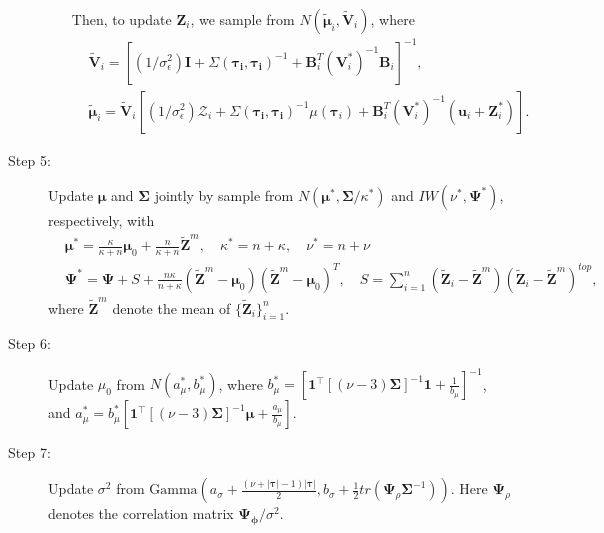 \begin{description}
\begin{itemize}
Then, to update $\mathbf{Z}_i$, we sample from $N(\tilde{\boldsymbol{\mu}}_i,\tilde{\mathbf{V}}_i)$, where
\begin{equation*}
\begin{split}
&\tilde{\mathbf{V}}_i=[(1/\sigma_{\epsilon}^2)\mathbf{I}+\Sigma(\boldsymbol{\tau_i},\boldsymbol{\tau_i})^{-1}+\mathbf{B}_i^T(\boldsymbol{V}_i^*)^{-1}\mathbf{B}_i]^{-1},\\
&\tilde{\boldsymbol{\mu}}_i=\tilde{\mathbf{V}}_i[(1/\sigma_{\epsilon}^2)\boldsymbol{\mathcal{Z}}_i+\Sigma(\boldsymbol{\tau_i},\boldsymbol{\tau_i})^{-1}\mu(\mathbf{\tau}_i)+\mathbf{B}_i^T(\boldsymbol{V}_i^*)^{-1}(\mathbf{u}_i+\mathbf{Z}_i^*)].
\end{split}
\end{equation*}
   \end{itemize}
 
   \item[Step 5:] Update $\boldsymbol{\mu}$ and $\boldsymbol{\Sigma}$ jointly by sample from $N(\boldsymbol{\mu}^*,\boldsymbol{\Sigma}/\kappa^*)$ and $IW(\nu^*,\boldsymbol{\Psi}^*)$, respectively, with
   \begin{equation*}
\begin{split}
&\boldsymbol{\mu}^*=\frac{\kappa}{\kappa+n}\boldsymbol{\mu}_0+\frac{n}{\kappa+n}\tilde{\mathbf{Z}}^m,\quad
\kappa^*=n+\kappa,\quad \nu^*=n+\nu\\
&\boldsymbol{\Psi}^*=\boldsymbol{\Psi}+S+\frac{n\kappa}{n+\kappa}(\tilde{\mathbf{Z}}^m-\boldsymbol{\mu}_0)(\tilde{\mathbf{Z}}^m-\boldsymbol{\mu}_0)^T,\quad
S=\sum^{n}_{i=1}(\tilde{\mathbf{Z}}_i-\tilde{\mathbf{Z}}^m)(\tilde{\mathbf{Z}}_i-\tilde{\mathbf{Z}}^m)^{top},
\end{split}
\end{equation*}
where $\tilde{\mathbf{Z}}^m$ denote the mean of $\{\tilde{\mathbf{Z}}_i\}_{i=1}^n$.
 
   \item[Step 6:] Update $\mu_0$ from $N(a_{\mu}^*,b_{\mu}^*)$, where $b_{\mu}^*=[\mathbf{1}^{\top}[(\nu-3)\boldsymbol{\Sigma}]^{-1}\mathbf{1}+\frac{1}{b_{\mu}}]^{-1}$, and $a_{\mu}^*=b_{\mu}^*[\mathbf{1}^{\top}[(\nu-3)\boldsymbol{\Sigma}]^{-1}\boldsymbol{\mu}+\frac{a_{\mu}}{b_{\mu}}]$.
   
   \item[Step 7:] Update $\sigma^2$ from $\text{Gamma}(a_{\sigma}+\frac{(\nu+|\boldsymbol{\tau}|-1)|\boldsymbol{\tau}|}{2},b_{\sigma}+\frac{1}{2}tr(\boldsymbol{\Psi}_{\rho}\boldsymbol{\Sigma}^{-1}))$. Here $\boldsymbol{\Psi}_{\rho}$ denotes the correlation matrix $\boldsymbol{\Psi}_{\boldsymbol{\phi}}/\sigma^2$.
   

\end{description}
